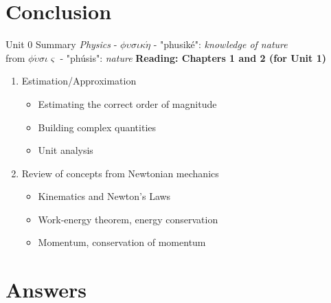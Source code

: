 \documentclass{beamer}
\begin{document}
\section{Conclusion}

\begin{frame}{Unit 0 Summary}
\textit{Physics} - $\phi\upsilon\sigma\iota\kappa\acute{\eta}$ - "phusik\'e": \textit{knowledge of nature} \\
from $\phi\acute{\upsilon}\sigma\iota\varsigma$ - "ph\'usis": \textit{nature}
\textbf{Reading: Chapters 1 and 2 (for Unit 1)}
\begin{enumerate}
\item Estimation/Approximation
\begin{itemize}
\item \alert{Estimating} the correct order of magnitude
\item \alert{Building} complex quantities
\item \alert{Unit analysis}
\end{itemize}
\item Review of concepts from Newtonian mechanics
\begin{itemize}
\item Kinematics and \alert{Newton's Laws}
\item Work-energy theorem, energy conservation
\item Momentum, conservation of momentum
\end{itemize}
\end{enumerate}
\end{frame}

\section{Answers}
\end{document}
